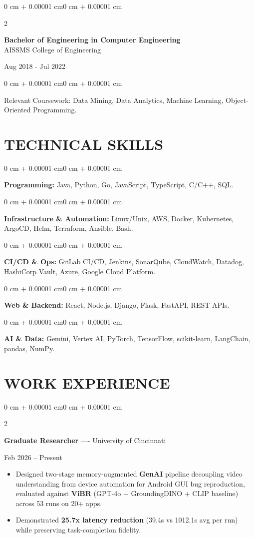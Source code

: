 \documentclass[10pt, letterpaper]{article}
\newenvironment{highlights}{
    \begin{itemize}[
        topsep=0.10 cm,
        parsep=0.06 cm,
        partopsep=0pt,
        itemsep=0.06 cm,
        leftmargin=12pt
    ]
}{
    \end{itemize}
}
\newenvironment{onecolentry}{
    \begin{adjustwidth}{0 cm + 0.00001 cm}{0 cm + 0.00001 cm}
}{
    \end{adjustwidth}
}
\newenvironment{twocolentry}[2][]{
    \onecolentry
    \def\secondColumn{#2}
    \setcolumnwidth{\fill, 4.5 cm}
    \begin{paracol}{2}
}{
    \switchcolumn \raggedleft \secondColumn
    \end{paracol}
    \endonecolentry
}
\begin{document}
\begin{twocolentry}{
    Aug 2018 - Jul 2022
}
    \textbf{Bachelor of Engineering in Computer Engineering} \\
    AISSMS College of Engineering
\end{twocolentry}
\begin{onecolentry}
Relevant Coursework: Data Mining, Data Analytics, Machine Learning, Object-Oriented Programming.
\end{onecolentry}
\section{TECHNICAL SKILLS}
\begin{onecolentry}
\textbf{Programming:} Java, Python, Go, JavaScript, TypeScript, C/C++, SQL.
\end{onecolentry}
\vspace{0.06 cm}
\begin{onecolentry}
\textbf{Infrastructure \& Automation:} Linux/Unix, AWS, Docker, Kubernetes, ArgoCD, Helm, Terraform, Ansible, Bash.
\end{onecolentry}
\vspace{0.06 cm}
\begin{onecolentry}
\textbf{CI/CD \& Ops:} GitLab CI/CD, Jenkins, SonarQube, CloudWatch, Datadog, HashiCorp Vault, Azure, Google Cloud Platform.
\end{onecolentry}
\vspace{0.06 cm}
\begin{onecolentry}
\textbf{Web \& Backend:} React, Node.js, Django, Flask, FastAPI, REST APIs.
\end{onecolentry}
\vspace{0.06 cm}
\begin{onecolentry}
\textbf{AI \& Data:} Gemini, Vertex AI, PyTorch, TensorFlow, scikit-learn, LangChain, pandas, NumPy.
\end{onecolentry}

\section{WORK EXPERIENCE}
\begin{twocolentry}{Feb 2026 -- Present}
\textbf{Graduate Researcher} ---- University of Cincinnati
\end{twocolentry}
\begin{highlights}
  \item Designed two-stage memory-augmented \textbf{GenAI} pipeline decoupling video understanding from device automation for Android GUI bug reproduction, evaluated against \textbf{ViBR} (GPT-4o + GroundingDINO + CLIP baseline) across 53 runs on 20+ apps.
  \item Demonstrated \textbf{25.7x latency reduction} (39.4s vs 1012.1s avg per run) while preserving task-completion fidelity.
\end{highlights}
\end{document}
